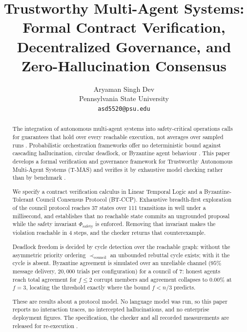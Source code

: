 \documentclass[10pt,journal,compsoc,twocolumn]{IEEEtran}
\begin{document}
\title{Trustworthy Multi-Agent Systems: Formal Contract Verification, Decentralized Governance, and Zero-Hallucination Consensus}

\author{
Aryaman Singh Dev\\
Pennsylvania State University \\
\texttt{asd5520@psu.edu}
}

\maketitle

\begin{abstract}
The integration of autonomous multi-agent systems into safety-critical operations calls for guarantees that hold over every reachable execution, not averages over sampled runs \cite{arxiv_2005_14165,arxiv_2203_02155}. Probabilistic orchestration frameworks offer no deterministic bound against cascading hallucination, circular deadlock, or Byzantine agent behaviour \cite{arxiv_2312_03893,arxiv_2406_00584}. This paper develops a formal verification and governance framework for Trustworthy Autonomous Multi-Agent Systems (T-MAS) and verifies it by exhaustive model checking rather than by benchmark \cite{crossref_10_1109_access_2026_3656309}.

We specify a contract verification calculus in Linear Temporal Logic and a Byzantine-Tolerant Council Consensus Protocol (BT-CCP). Exhaustive breadth-first exploration of the council protocol reaches 37 states over 111 transitions in well under a millisecond, and establishes that no reachable state commits an ungrounded proposal while the safety invariant $\Phi_{\text{safety}}$ is enforced. Removing that invariant makes the violation reachable in 4 steps, and the checker returns that counterexample.

Deadlock freedom is decided by cycle detection over the reachable graph: without the asymmetric priority ordering $\prec_{\text{council}}$ an unbounded rebuttal cycle exists; with it the cycle is absent. Byzantine agreement is simulated over an unreliable channel ($95\%$ message delivery, $20{,}000$ trials per configuration) for a council of $7$: honest agents reach total agreement for $f \le 2$ corrupt members and agreement collapses to $0.00\%$ at $f = 3$, locating the threshold exactly where the bound $f < n/3$ predicts.

These are results about a protocol model. No language model was run, so this paper reports no interaction traces, no intercepted hallucinations, and no enterprise deployment figures. The specification, the checker and all recorded measurements are released for re-execution \cite{arxiv_2501_02497,crossref_10_1201_9788743808145_14}.
\end{abstract}
\end{document}
